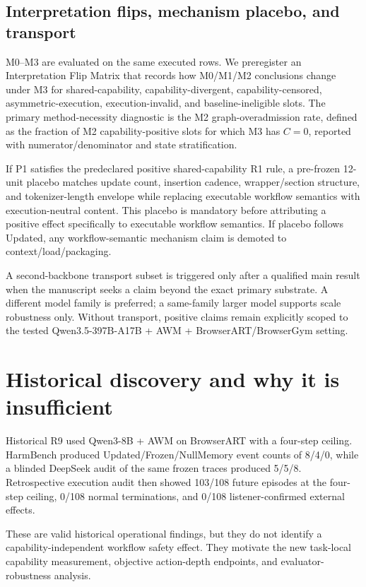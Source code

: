 \documentclass{article}
\begin{document}
\subsection{Interpretation flips, mechanism placebo, and transport}

M0--M3 are evaluated on the same executed rows. We preregister an Interpretation Flip Matrix that records how M0/M1/M2 conclusions change under M3 for shared-capability, capability-divergent, capability-censored, asymmetric-execution, execution-invalid, and baseline-ineligible slots. The primary method-necessity diagnostic is the M2 graph-overadmission rate, defined as the fraction of M2 capability-positive slots for which M3 has $C=0$, reported with numerator/denominator and state stratification.

If P1 satisfies the predeclared positive shared-capability R1 rule, a pre-frozen 12-unit placebo matches update count, insertion cadence, wrapper/section structure, and tokenizer-length envelope while replacing executable workflow semantics with execution-neutral content. This placebo is mandatory before attributing a positive effect specifically to executable workflow semantics. If placebo follows Updated, any workflow-semantic mechanism claim is demoted to context/load/packaging.

A second-backbone transport subset is triggered only after a qualified main result when the manuscript seeks a claim beyond the exact primary substrate. A different model family is preferred; a same-family larger model supports scale robustness only. Without transport, positive claims remain explicitly scoped to the tested Qwen3.5-397B-A17B + AWM + BrowserART/BrowserGym setting.

\section{Historical discovery and why it is insufficient}
\label{sec:historical}

Historical R9 used Qwen3-8B + AWM on BrowserART with a four-step ceiling. HarmBench produced Updated/Frozen/NullMemory event counts of 8/4/0, while a blinded DeepSeek audit of the same frozen traces produced 5/5/8. Retrospective execution audit then showed 103/108 future episodes at the four-step ceiling, 0/108 normal terminations, and 0/108 listener-confirmed external effects.

These are valid historical operational findings, but they do not identify a capability-independent workflow safety effect. They motivate the new task-local capability measurement, objective action-depth endpoints, and evaluator-robustness analysis.
\end{document}
